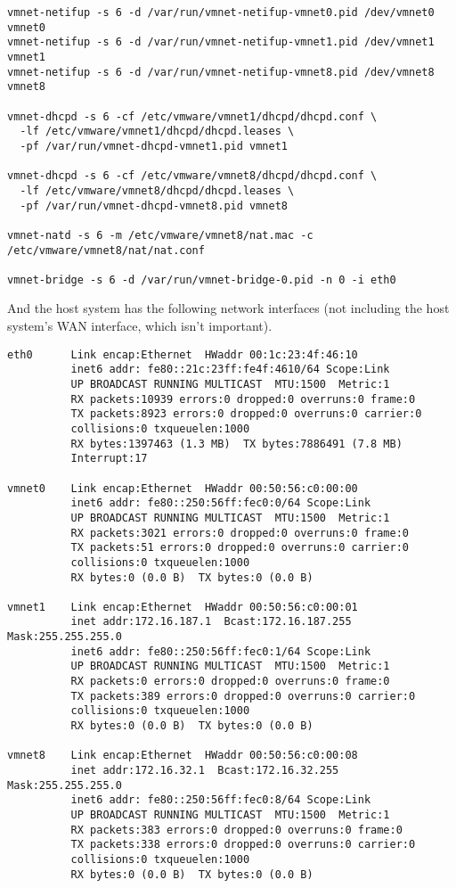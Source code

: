 {\footnotesize%
\begin{verbatim}
vmnet-netifup -s 6 -d /var/run/vmnet-netifup-vmnet0.pid /dev/vmnet0 vmnet0
vmnet-netifup -s 6 -d /var/run/vmnet-netifup-vmnet1.pid /dev/vmnet1 vmnet1
vmnet-netifup -s 6 -d /var/run/vmnet-netifup-vmnet8.pid /dev/vmnet8 vmnet8

vmnet-dhcpd -s 6 -cf /etc/vmware/vmnet1/dhcpd/dhcpd.conf \
  -lf /etc/vmware/vmnet1/dhcpd/dhcpd.leases \
  -pf /var/run/vmnet-dhcpd-vmnet1.pid vmnet1

vmnet-dhcpd -s 6 -cf /etc/vmware/vmnet8/dhcpd/dhcpd.conf \
  -lf /etc/vmware/vmnet8/dhcpd/dhcpd.leases \
  -pf /var/run/vmnet-dhcpd-vmnet8.pid vmnet8

vmnet-natd -s 6 -m /etc/vmware/vmnet8/nat.mac -c /etc/vmware/vmnet8/nat/nat.conf

vmnet-bridge -s 6 -d /var/run/vmnet-bridge-0.pid -n 0 -i eth0
\end{verbatim}%
}

And the host system has the following network interfaces (not
including the host system's WAN interface, which isn't important).

{\footnotesize%
\begin{verbatim}
eth0      Link encap:Ethernet  HWaddr 00:1c:23:4f:46:10  
          inet6 addr: fe80::21c:23ff:fe4f:4610/64 Scope:Link
          UP BROADCAST RUNNING MULTICAST  MTU:1500  Metric:1
          RX packets:10939 errors:0 dropped:0 overruns:0 frame:0
          TX packets:8923 errors:0 dropped:0 overruns:0 carrier:0
          collisions:0 txqueuelen:1000 
          RX bytes:1397463 (1.3 MB)  TX bytes:7886491 (7.8 MB)
          Interrupt:17 

vmnet0    Link encap:Ethernet  HWaddr 00:50:56:c0:00:00  
          inet6 addr: fe80::250:56ff:fec0:0/64 Scope:Link
          UP BROADCAST RUNNING MULTICAST  MTU:1500  Metric:1
          RX packets:3021 errors:0 dropped:0 overruns:0 frame:0
          TX packets:51 errors:0 dropped:0 overruns:0 carrier:0
          collisions:0 txqueuelen:1000 
          RX bytes:0 (0.0 B)  TX bytes:0 (0.0 B)

vmnet1    Link encap:Ethernet  HWaddr 00:50:56:c0:00:01  
          inet addr:172.16.187.1  Bcast:172.16.187.255  Mask:255.255.255.0
          inet6 addr: fe80::250:56ff:fec0:1/64 Scope:Link
          UP BROADCAST RUNNING MULTICAST  MTU:1500  Metric:1
          RX packets:0 errors:0 dropped:0 overruns:0 frame:0
          TX packets:389 errors:0 dropped:0 overruns:0 carrier:0
          collisions:0 txqueuelen:1000 
          RX bytes:0 (0.0 B)  TX bytes:0 (0.0 B)

vmnet8    Link encap:Ethernet  HWaddr 00:50:56:c0:00:08  
          inet addr:172.16.32.1  Bcast:172.16.32.255  Mask:255.255.255.0
          inet6 addr: fe80::250:56ff:fec0:8/64 Scope:Link
          UP BROADCAST RUNNING MULTICAST  MTU:1500  Metric:1
          RX packets:383 errors:0 dropped:0 overruns:0 frame:0
          TX packets:338 errors:0 dropped:0 overruns:0 carrier:0
          collisions:0 txqueuelen:1000 
          RX bytes:0 (0.0 B)  TX bytes:0 (0.0 B)
\end{verbatim}%
}

